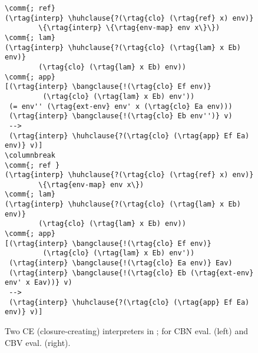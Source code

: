 \begin{figure*}[h]
\begin{multicols}{2}
\vspace{-0.3cm}
\begin{Verbatim}[baselinestretch=.75,commandchars=\\\{\}]
\comm{; ref}
(\rtag{interp} \huhclause{?(\rtag{clo} (\rtag{ref} x) env)}
        \{\rtag{interp} \{\rtag{env-map} env x\}\})
\comm{; lam}
(\rtag{interp} \huhclause{?(\rtag{clo} (\rtag{lam} x Eb) env)}
        (\rtag{clo} (\rtag{lam} x Eb) env))
\comm{; app}
[(\rtag{interp} \bangclause{!(\rtag{clo} Ef env)}
         (\rtag{clo} (\rtag{lam} x Eb) env'))
 (= env'' (\rtag{ext-env} env' x (\rtag{clo} Ea env)))       
 (\rtag{interp} \bangclause{!(\rtag{clo} Eb env'')} v)
 -->
 (\rtag{interp} \huhclause{?(\rtag{clo} (\rtag{app} Ef Ea) env)} v)]  
\columnbreak
\comm{; ref }
(\rtag{interp} \huhclause{?(\rtag{clo} (\rtag{ref} x) env)}
        \{\rtag{env-map} env x\})
\comm{; lam}
(\rtag{interp} \huhclause{?(\rtag{clo} (\rtag{lam} x Eb) env)}
        (\rtag{clo} (\rtag{lam} x Eb) env))
\comm{; app}
[(\rtag{interp} \bangclause{!(\rtag{clo} Ef env)}
         (\rtag{clo} (\rtag{lam} x Eb) env'))
 (\rtag{interp} \bangclause{!(\rtag{clo} Ea env)} Eav)
 (\rtag{interp} \bangclause{!(\rtag{clo} Eb (\rtag{ext-env} env' x Eav))} v)
 -->
 (\rtag{interp} \huhclause{?(\rtag{clo} (\rtag{app} Ef Ea) env)} v)]
\end{Verbatim}
\end{multicols}
\caption{Two CE (closure-creating) interpreters in \slog{}; for CBN eval. (left) and CBV eval. (right).}
\label{fig:ce-machines}
\end{figure*}
